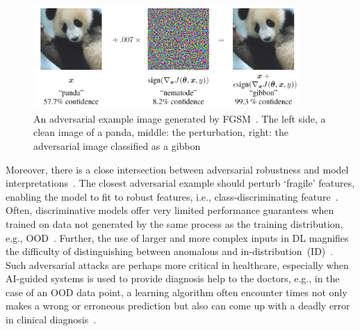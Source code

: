 \begin{figure}
    \centering
    \includegraphics[width=0.9\textwidth,height=40mm]{images/panda_adversary.png}
    \caption{An adversarial example image generated by FGSM~\cite{goodfellow2014explaining}. The left side, a clean image of a panda, middle: the perturbation, right: the adversarial image classified as a gibbon}
    \label{fig:fgsm_example}
    \vspace{-4mm}
\end{figure}

\hspace*{3.5mm} Moreover, there is a close intersection between adversarial robustness and model interpretations~\cite{bhatt2020explainable,sharma2019certifai}. The closest adversarial example should perturb `fragile' features, enabling the model to fit to robust features, i.e., class-discriminating feature~\cite{bhatt2020explainable}. Often, discriminative models offer very limited performance guarantees when trained on data not generated by the same process as the training distribution, e.g., OOD~\cite{OOD1}. Further, the use of larger and more complex inputs in DL magnifies the difficulty of distinguishing between anomalous and in-distribution~(ID)~\cite{OOD5}. Such adversarial attacks are perhaps more critical in healthcare, especially when AI-guided systems is used to provide diagnosis help to the doctors, e.g., in the case of an OOD data point, a learning algorithm often encounter times not only makes a wrong or erroneous prediction but also can come up with a deadly error in clinical diagnosis~\cite{OOD1}. 

